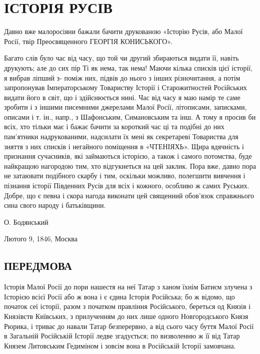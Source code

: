  
 
 
 
 

\chapter{ІСТОРІЯ РУСІВ}

\begin{zznagolos}
Давно вже малоросіяни бажали бачити друкованою «Історію Русів, або Малої Росії,
твір Преосвященного ГЕОРГІЯ КОНИСЬКОГО».

Багато слів було час від часу, що той чи другий збираються видати її, навіть
друкують; але до сих пір Ті як нема, так нема! Маючи кілька списків цієї
історії, я вибрав ліпший з- поміж них, підвів до нього з інших різночитання, а
потім запропонував Імператорському Товариству Історії і Старожитностей
Російських видати його в світ, що і здійснюється нині. Час від часу я маю намір
те саме зробити і з іншими писемними джерелами Малої Росії, літописами,
записками, описами і т. ін., напр., з Шафонським, Симановським та інш.  А тому
я просив би всіх, хто тільки має і бажає бачити за короткий час ці та подібні
до них пам'ятники надрукованими, надсилати їх мені як секретареві Товариства
для зняття з них списків і негайного поміщення в «ЧТЕНІЯХЬ». Щира вдячність і
признання сучасників, які займаються історією, а також і самого потомства, буде
найкращою нагородою тим, хто відгукнеться на цей заклик. Пора вже, давно пора
не затаювати подібного скарбу і тим, оскільки можливо, полегшити вивчення і
пізнання історії Південних Русів для всіх і кожного, особливо ж самих Руських.
Добре, що є певна і скора нагода виконати цей священний обов'язок справжнього
сина свого народу і батьківщини.

О. Бодянський

Лютого 9, 1846, Москва
\end{zznagolos}

\section{ПЕРЕДМОВА}

Історія Малої Росії до пори нашестя на неї Татар з ханом їхнім Батиєм злучена з
Історією всієї Росії або ж вона і є єдина Історія Російська; бо ж відомо, що
початок сеї історії, разом з початком правління Російського, береться од Князів
і Князівств Київських, з прилученням до них лише одного Новгородського Князя
Рюрика, і триває до навали Татар безперервно, а від сього часу буття Малої
Росії в Загальній Російській Історії ледве згадується; по визволенню ж її від
Татар Князем Литовським Гедиміном і зовсім вона в Російській Історії замовчана.


